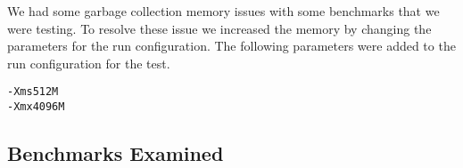   

We had some garbage collection memory issues with some benchmarks that we were testing. To resolve these issue we increased the memory by changing the parameters for the run configuration.  The following parameters were added to the run configuration for the test.

\begin{verbatim}
-Xms512M 
-Xmx4096M
\end{verbatim}



\subsection{Benchmarks Examined}
